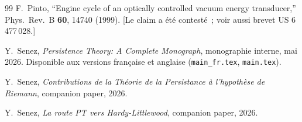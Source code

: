 \documentclass[11pt,a4paper]{article}
\begin{document}
\begin{thebibliography}{99}
F.~Pinto, ``Engine cycle of an optically controlled vacuum energy transducer,''
Phys.\ Rev.\ B \textbf{60}, 14740 (1999). [Le claim a été contesté~; voir aussi
brevet US 6\,477\,028.]

Y.~Senez, \emph{Persistence Theory: A Complete Monograph}, monographie interne, mai 2026.
Disponible aux versions française et anglaise (\texttt{main\_fr.tex}, \texttt{main.tex}).

Y.~Senez, \emph{Contributions de la Théorie de la Persistance à l'hypothèse de Riemann},
companion paper, 2026.

Y.~Senez, \emph{La route PT vers Hardy-Littlewood}, companion paper, 2026.

\end{thebibliography}
\end{document}
